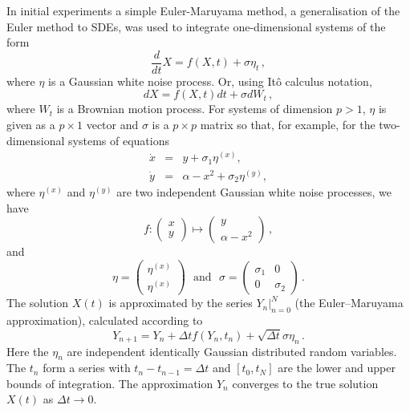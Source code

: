 {{	In initial experiments a simple Euler-Maruyama method, a generalisation of the Euler method to SDEs, was used to integrate one-dimensional systems of the form
		\begin{equation}
		\label{eqn:1D:numerical_integration:standardform}
			\frac{d}{dt}X = f(X,t) + \sigma\eta_t\,,
		\end{equation}
	where $\eta$ is a Gaussian white noise process. Or, using It\^{o} calculus notation,
		\begin{equation}
		\label{eqn:1D:numerical_integration:Ito_form}
			dX = f(X,t)dt + \sigma dW_t\,,
		\end{equation}
	where $W_t$ is a Brownian motion process. For systems of dimension $p>1$, $\eta$ is given as a $p\times 1$ vector and $\sigma$ is a $p\times p$ matrix so that, for example, for the two-dimensional systems of equations
		\begin{equation}
			\begin{array}{rcl}
			\dot{x} &=& y + \sigma_1 \eta^{(x)},\\
			\dot{y} &=& \alpha -  x^2 + \sigma_2\eta^{(y)},
			\end{array}
		\label{eqn:1D:numerical:homoclinicSystem}
		\end{equation}
	where $\eta^{(x)}$ and $\eta^{(y)}$ are two independent Gaussian white noise processes, we have
		\begin{equation}
			f:\begin{pmatrix}
			x\\
			y
			\end{pmatrix}\mapsto \begin{pmatrix}
			y\\
			\alpha - x^2
			\end{pmatrix}\,,
		\end{equation}
	and
		\begin{equation}
			\eta = \begin{pmatrix}
			\eta^{(x)}\\
			\eta^{(x)}
			\end{pmatrix} ~~~\text{and}~~~ \sigma = \begin{pmatrix}
			\sigma_1 & 0\\
			0 & \sigma_2
			\end{pmatrix}\,.
		\end{equation}
	The solution $X(t)$ is approximated by the series $Y_n|_{n=0}^N$ (the Euler–Maruyama approximation), calculated according to
		\begin{equation}
		\label{eqn:1D:numerical_integration:EM_method}
			Y_{n+1} = Y_n + \Delta t f(Y_n,t_n) + \sqrt{\Delta t}\sigma\eta_n\,.
		\end{equation}
	Here the $\eta_n$ are independent identically Gaussian distributed random variables. The $t_n$ form a series with $t_n - t_{n-1} = \Delta t$ and $[t_0, t_N]$ are the lower and upper bounds of integration. The approximation $Y_n$ converges to the true solution $X(t)$ as $\Delta t \rightarrow 0$. 
	
}}
